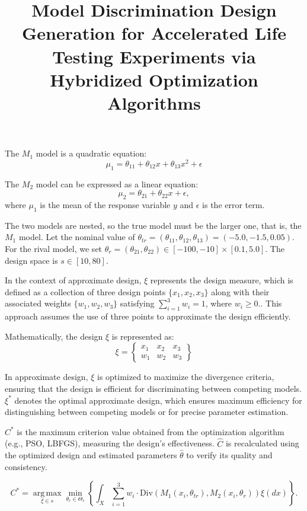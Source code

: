 \documentclass[12pt, a4paper]{article}
\title{Model Discrimination Design Generation for Accelerated Life Testing Experiments via Hybridized Optimization Algorithms}	%
\date{}
\begin{document}
\renewcommand{\tablename}{Table}	
\renewcommand{\figurename}{Figure}
\maketitle
\fontsize{12}{22pt}\selectfont 








The $M_1$ model is a quadratic equation:
$$\mu_1=\theta_{11}+\theta_{12}x+\theta_{13}x^2+\epsilon$$

The $M_2$ model can be expressed as a linear equation:
$$\mu_2=\theta_{21}+\theta_{22}x+\epsilon,$$
where $\mu_1$ is the mean of the response variable $y$ and $\epsilon$ is the error term.

The two models are nested, so the true model must be the larger one, that is, the $M_1$ model. Let the nominal value of $\theta_{tr} = (\theta_{11}, \theta_{12}, \theta_{13}) = (-5.0, -1.5,0.05)$. For the rival model, we set $\theta_r = (\theta_{21}, \theta_{22}) \in [-100,-10] \times [0.1,5.0]$. The design space is $s\in [10,80]$.

In the context of approximate design, $ \xi $ represents the design measure, which is defined as a collection of three design points $ \{x_1, x_2, x_3\} $ along with their associated weights $ \{w_1, w_2, w_3\} $ satisfying $ \sum_{i=1}^3 w_i = 1 $, where $ w_i \geq 0 $.. This approach assumes the use of three points to approximate the design efficiently.

Mathematically, the design $ \xi $ is represented as:
$$
\xi = \left\{\begin{array}{ccc}
x_1 & x_2 & x_3 \\
w_1 & w_2 & w_3
\end{array}\right\}
$$

In approximate design, $ \xi $ is optimized to maximize the divergence criteria, ensuring that the design is efficient for discriminating between competing models. $ \xi^* $ denotes the optimal approximate design, which ensures maximum efficiency for distinguishing between competing models or for precise parameter estimation.

$C^*$ is the maximum criterion value obtained from the optimization algorithm (e.g., PSO, LBFGS), measuring the design's effectiveness. $\hat{C}$ is recalculated using the optimized design and estimated parameters $\hat{\theta}$ to verify its quality and consistency.

$$
C^* = {\underset{\xi \in s}{\operatorname{arg\,max}}} \min_{\theta_r \in \Theta_r} \left\{ \int_X \sum_{i=1}^3 w_i \cdot \text{Div} \left( M_1(x_i, \theta_{tr}), M_2(x_i, \theta_r) \right) \xi(dx) \right\}.
$$
\end{document}

